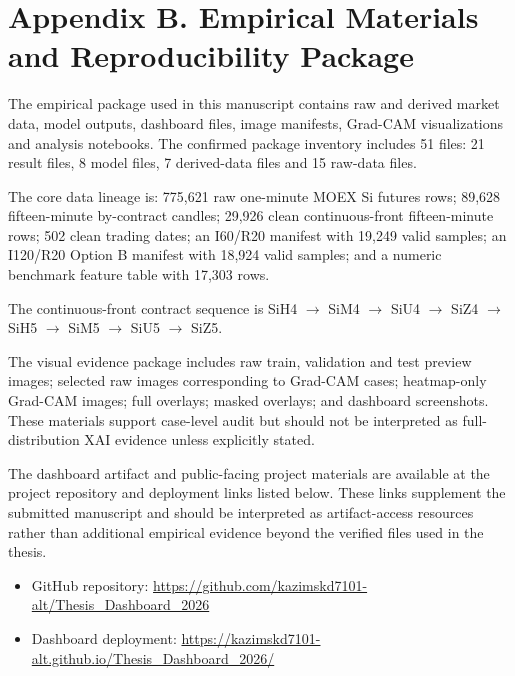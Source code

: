 \section*{Appendix B. Empirical Materials and Reproducibility Package}
The empirical package used in this manuscript contains raw and derived market data, model outputs, dashboard files, image manifests, Grad-CAM visualizations and analysis notebooks. The confirmed package inventory includes 51 files: 21 result files, 8 model files, 7 derived-data files and 15 raw-data files.

The core data lineage is: 775,621 raw one-minute MOEX Si futures rows; 89,628 fifteen-minute by-contract candles; 29,926 clean continuous-front fifteen-minute rows; 502 clean trading dates; an I60/R20 manifest with 19,249 valid samples; an I120/R20 Option B manifest with 18,924 valid samples; and a numeric benchmark feature table with 17,303 rows.

The continuous-front contract sequence is SiH4 $\rightarrow$ SiM4 $\rightarrow$ SiU4 $\rightarrow$ SiZ4 $\rightarrow$ SiH5 $\rightarrow$ SiM5 $\rightarrow$ SiU5 $\rightarrow$ SiZ5.

The visual evidence package includes raw train, validation and test preview images; selected raw images corresponding to Grad-CAM cases; heatmap-only Grad-CAM images; full overlays; masked overlays; and dashboard screenshots. These materials support case-level audit but should not be interpreted as full-distribution XAI evidence unless explicitly stated.

The dashboard artifact and public-facing project materials are available at the project repository and deployment links listed below. These links supplement the submitted manuscript and should be interpreted as artifact-access resources rather than additional empirical evidence beyond the verified files used in the thesis.

\begin{itemize}
    \item GitHub repository: \url{https://github.com/kazimskd7101-alt/Thesis_Dashboard_2026}
    \item Dashboard deployment: \url{https://kazimskd7101-alt.github.io/Thesis_Dashboard_2026/}
\end{itemize}

